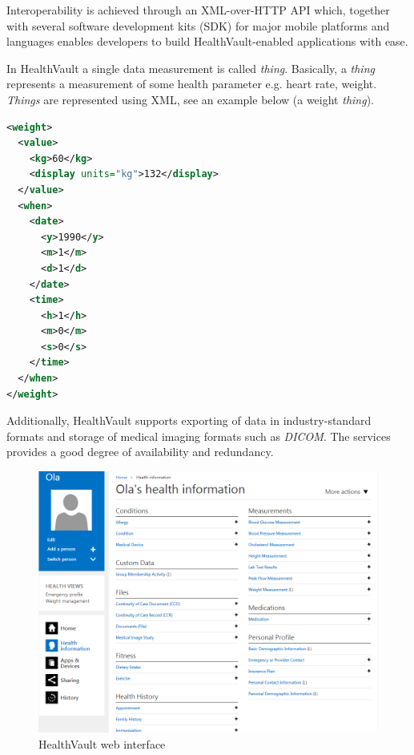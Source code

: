 
Interoperability is achieved through an XML-over-HTTP API which, together with several software development kits (SDK) for major mobile platforms and languages enables developers to build HealthVault-enabled applications with ease.

In HealthVault a single data measurement is called \textit{thing}.
Basically, a \textit{thing} represents a measurement of some health parameter e.g. heart rate, weight.
\textit{Things} are represented using XML, see an example below (a weight \textit{thing}).

\begin{lstlisting}[language=XML]
<weight>
  <value>
    <kg>60</kg>
    <display units="kg">132</display>
  </value>
  <when>
    <date>
      <y>1990</y>
      <m>1</m>
      <d>1</d>
    </date>
    <time>
      <h>1</h>
      <m>0</m>
      <s>0</s>
    </time>
  </when>
</weight>
\end{lstlisting}


Additionally, HealthVault supports exporting of data in industry-standard formats and storage of medical imaging formats such as \textit{DICOM}. 
The services provides a good degree of availability and redundancy. \cite{HealthVault}

\begin{figure}[h]
\begin{center}
\includegraphics[scale=0.50]{../Figures/hv-page.png}
\end{center}
\caption{HealthVault web interface}
\label{figure:hv-page}
\end{figure}

